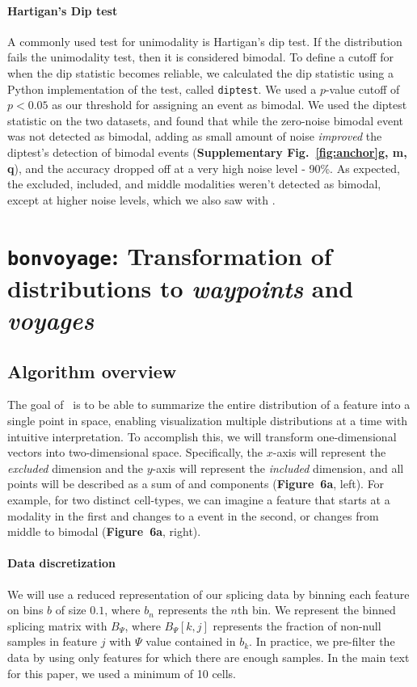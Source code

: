 \paragraph{Hartigan's Dip test}
A commonly used test for unimodality is Hartigan's dip test\cite{Hartigan:1985ca}. If the distribution fails the unimodality test, then it is considered bimodal. To define a cutoff for when the dip statistic becomes reliable, we calculated the dip statistic using a Python implementation of the test, called \texttt{diptest}\cite{Anonymous:zTNIPlgQ}. We used a $p$-value cutoff of $p <0.05$ as our threshold for assigning an event as bimodal. We used the diptest statistic on the two datasets, and found that while the zero-noise bimodal event was not detected as bimodal, adding as small amount of noise \emph{improved} the diptest's detection of bimodal events (\textbf{Supplementary Fig.~\ref{fig:anchor}g, m, q}), and the accuracy dropped off at a very high noise level - 90\%. As expected, the excluded, included, and middle modalities weren't detected as bimodal, except at higher noise levels, which we also saw with \anchor.


\section{\texttt{bonvoyage}: Transformation of distributions to \emph{waypoints} and \emph{voyages}}
\label{sec:bonvoyage}

\subsection{Algorithm overview}

The goal of \bonvoyage\, is to be able to summarize the entire distribution of a feature into a single point in space, enabling visualization multiple distributions at a time with intuitive interpretation. To accomplish this, we will transform one-dimensional vectors into two-dimensional space. Specifically, the $x$-axis will represent the \emph{excluded} dimension and the $y$-axis will represent the \emph{included} dimension, and all points will be described as a sum of \0 and \1 components (\textbf{Figure~6a}, left). For example, for two distinct cell-types, we can imagine a feature that starts at a \1 modality in the first and changes to a \0 event in the second, or changes from middle to bimodal (\textbf{Figure~6a}, right).



\paragraph{Data discretization}
We will use a reduced representation of our splicing data by binning each feature on bins $b$ of size $0.1$, where $b_n$ represents the $n$th bin. We represent the binned splicing matrix with $B_\Psi$, where $B_\Psi[k,j]$ represents the fraction of non-null samples in feature $j$ with $\Psi$ value contained in $b_k$. In practice, we pre-filter the data by using only features for which there are enough samples. In the main text for this paper, we used a minimum of 10 cells.

